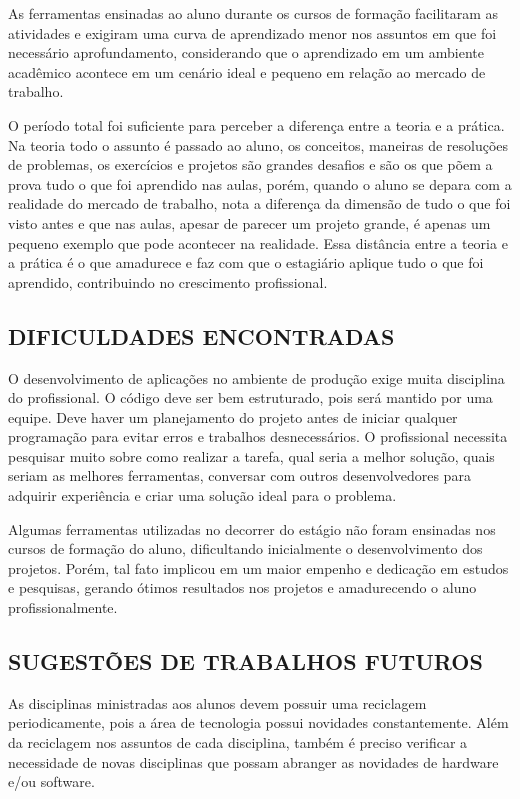 \documentclass[
  12pt,				%
  openany,
  oneside,
  a4paper,			%
  english,			%
  brazil
]{article}
\numberwithin{figure}{section}
\numberwithin{table}{section}
\begin{document}
As ferramentas ensinadas ao aluno durante os cursos de formação facilitaram as atividades e exigiram uma curva de aprendizado menor nos assuntos em que foi necessário aprofundamento, considerando que o aprendizado em um ambiente acadêmico acontece em um cenário ideal e pequeno em relação ao mercado de trabalho.

O período total foi suficiente para perceber a diferença entre a teoria e a prática. Na teoria todo o assunto é passado ao aluno, os conceitos, maneiras de resoluções de problemas, os exercícios e projetos são grandes desafios e são os que põem a prova tudo o que foi aprendido nas aulas, porém, quando o aluno se depara com a realidade do mercado de trabalho, nota a diferença da dimensão de tudo o que foi visto antes e que nas aulas, apesar de parecer um projeto grande, é apenas um pequeno exemplo que pode acontecer na realidade. Essa distância entre a teoria e a prática é o que amadurece e faz com que o estagiário aplique tudo o que foi aprendido, contribuindo no crescimento profissional.


\subsection{DIFICULDADES ENCONTRADAS}

O desenvolvimento de aplicações no ambiente de produção exige muita disciplina do profissional. O código deve ser bem estruturado, pois será mantido por uma equipe. Deve haver um planejamento do projeto antes de iniciar qualquer programação para evitar erros e trabalhos desnecessários. O profissional necessita pesquisar muito sobre como realizar a tarefa, qual seria a melhor solução, quais seriam as melhores ferramentas, conversar com outros desenvolvedores para adquirir experiência e criar uma solução ideal para o problema.

Algumas ferramentas utilizadas no decorrer do estágio não foram ensinadas nos cursos de formação do aluno, dificultando inicialmente o desenvolvimento dos projetos. Porém, tal fato implicou em um maior empenho e dedicação em estudos e pesquisas, gerando ótimos resultados nos projetos e amadurecendo o aluno profissionalmente.


\subsection{SUGESTÕES DE TRABALHOS FUTUROS}

As disciplinas ministradas aos alunos devem possuir uma reciclagem periodicamente,
pois a área de tecnologia possui novidades constantemente. Além da reciclagem nos assuntos de cada disciplina, também é preciso verificar a necessidade de novas disciplinas que possam abranger as novidades de hardware e/ou software.
\end{document}
